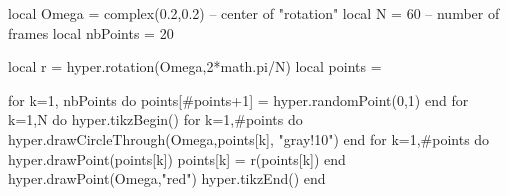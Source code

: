 \documentclass[margin=.2cm,multi,tikz]{standalone}
\begin{document}
\begin{luacode*}
local Omega = complex(0.2,0.2) -- center of "rotation"
local N = 60 -- number of frames
local nbPoints = 20

local r = hyper.rotation(Omega,2*math.pi/N)
local points = {}

for k=1, nbPoints do
	points[#points+1] = hyper.randomPoint(0,1)
end
for k=1,N do
	hyper.tikzBegin()
	for k=1,#points do
		hyper.drawCircleThrough(Omega,points[k], "gray!10")
	end
	for k=1,#points do
		hyper.drawPoint(points[k])
		points[k] = r(points[k])
	end
	hyper.drawPoint(Omega,"red")
	hyper.tikzEnd()
end
\end{luacode*}
\end{document}

